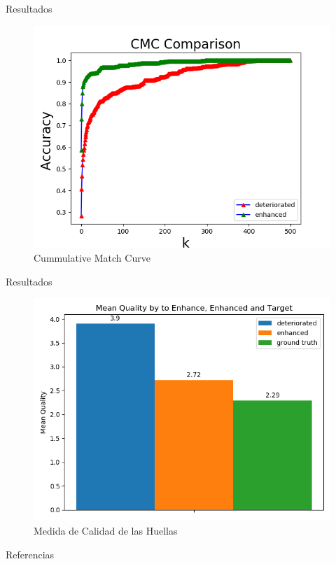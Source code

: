 \documentclass[12pt,aspectratio=169]{beamer}
\begin{document}
\begin{frame}{Resultados}

    \begin{figure}[h]
        \includegraphics[scale=0.54]{figs/cmc_comparison.png}
        \caption{Cummulative Match Curve}
    \end{figure}
    
\end{frame}

\begin{frame}{Resultados}

    \begin{figure}[h]
        \includegraphics[scale=0.54]{figs/mean_qualities.png}
        \caption{Medida de Calidad de las Huellas}
    \end{figure}
    
\end{frame}

\nocite{*}
\begin{frame}[allowframebreaks]{Referencias}


\end{frame}
\end{document}
